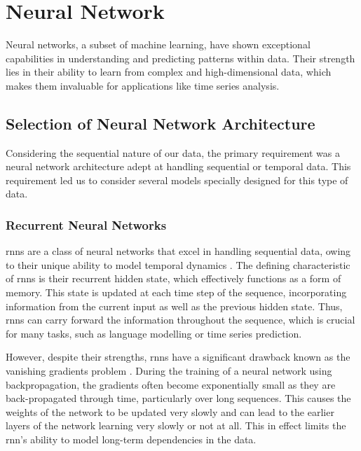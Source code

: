 \chapter{Neural Network}\label{chap:nn}

Neural networks, a subset of machine learning, have shown exceptional
capabilities in understanding and predicting patterns within data. Their
strength lies in their ability to learn from complex and high-dimensional data,
which makes them invaluable for applications like time series analysis.

\section{Selection of Neural Network Architecture}

Considering the sequential nature of our data, the primary requirement was a
neural network architecture adept at handling sequential or temporal data. This
requirement led us to consider several models specially designed for this type
of data.

\subsection{Recurrent Neural Networks}

\glspl{rnn} are a class of neural networks that excel in handling sequential data,
owing to their unique ability to model temporal dynamics \cite{doi:10.1073/pnas.79.8.2554}.
The defining characteristic of \glspl{rnn} is their recurrent hidden state,
which effectively functions as a form of memory. This state is updated at each
time step of the sequence, incorporating information from the current input as
well as the previous hidden state. Thus, \glspl{rnn} can carry forward the
information throughout the sequence, which is crucial for many tasks, such
as language modelling or time series prediction.

However, despite their strengths, \glspl{rnn} have a significant drawback known
as the vanishing gradients problem \cite{gradients:1994}. During the training
of a neural network using backpropagation, the gradients often become
exponentially small as they are back-propagated through time, particularly over
long sequences. This causes the weights of the network to be updated very
slowly and can lead to the earlier layers of the network learning very slowly
or not at all. This in effect limits the \gls{rnn}'s ability to model long-term
dependencies in the data.


